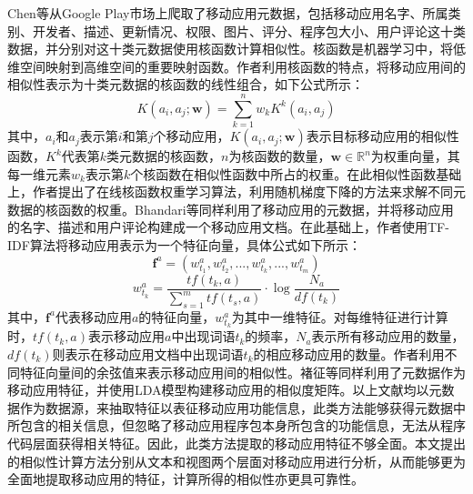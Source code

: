 Chen等\cite{chen2015simapp}从Google Play市场上爬取了移动应用元数据，包括移动应用名字、所属类别、开发者、描述、更新情况、权限、图片、评分、程序包大小、用户评论这十类数据，并分别对这十类元数据使用核函数计算相似性。核函数是机器学习中，将低维空间映射到高维空间的重要映射函数。作者利用核函数的特点，将移动应用间的相似性表示为十类元数据的核函数的线性组合，如下公式所示：
\begin{equation}
K(a_i, a_j; \mathbf{w}) = \sum_{k=1}^{n} w_k K^k (a_i, a_j)
\end{equation}
其中，$a_i$和$a_j$表示第$i$和第$j$个移动应用，$K(a_i, a_j; \mathbf{w})$表示目标移动应用的相似性函数，$K^k$代表第$k$类元数据的核函数，$n$为核函数的数量，$\mathbf{w} \in \mathbb{R}^n$为权重向量，其每一维元素$w_k$表示第$k$个核函数在相似性函数中所占的权重。在此相似性函数基础上，作者提出了在线核函数权重学习算法，利用随机梯度下降\cite{spall2005introduction}的方法来求解不同元数据的核函数的权重。Bhandari等\cite{bhandari2013serendipitous}同样利用了移动应用的元数据，并将移动应用的名字、描述和用户评论构建成一个移动应用文档。在此基础上，作者使用TF-IDF\cite{sparck1972statistical}算法将移动应用表示为一个特征向量，具体公式如下所示：
\begin{equation}
\mathbf{f}^a = (w_{t_1}^a, w_{t_2}^a, ..., w_{t_k}^a, ..., w_{t_m}^a)
\end{equation}
\begin{equation}
w_{t_k}^a = \frac{tf(t_k, a)}{\sum_{s=1}^{m} tf(t_s, a)} \cdot \log \frac{N_a}{df(t_k)}
\end{equation}
其中，$\mathbf{f}^a$代表移动应用$a$的特征向量，$w_{t_k}^a$为其中一维特征。对每维特征进行计算时，$tf(t_k, a)$表示移动应用$a$中出现词语$t_k$的频率，$N_a$表示所有移动应用的数量，$df(t_k)$则表示在移动应用文档中出现词语$t_k$的相应移动应用的数量。作者利用不同特征向量间的余弦值来表示移动应用间的相似性。褚征等\cite{chu2017construction}同样利用了元数据作为移动应用特征，并使用LDA模型\cite{blei2003latent}构建移动应用的相似度矩阵。以上文献均以元数据作为数据源，来抽取特征以表征移动应用功能信息，此类方法能够获得元数据中所包含的相关信息，但忽略了移动应用程序包本身所包含的功能信息，无法从程序代码层面获得相关特征。因此，此类方法提取的移动应用特征不够全面。本文提出的相似性计算方法分别从文本和视图两个层面对移动应用进行分析，从而能够更为全面地提取移动应用的特征，计算所得的相似性亦更具可靠性。

